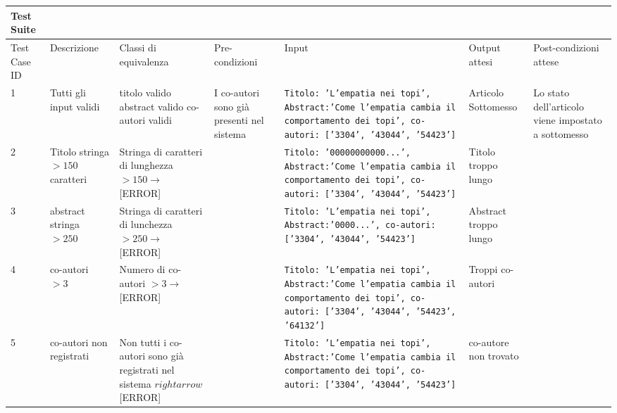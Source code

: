 \begin{sidewaystable}
  \small
  \centering
  \begin{tabular}{|p{2cm}|p{3cm}|p{3cm}|p{3cm}|p{3cm}|p{3cm}|p{3cm}|}
    \hline
    Test Suite &&&&&& \\
    \hline
    \hline
    Test Case ID & Descrizione & Classi di equivalenza & Pre\hyp{}condizioni & Input & Output attesi & Post\hyp{}condizioni attese \\
    \hline
    1 & Tutti gli input validi & titolo valido abstract valido co-autori validi & I co\hyp{}autori sono già presenti nel sistema & \texttt{Titolo: 'L'empatia nei topi', Abstract:'Come l'empatia cambia il comportamento dei topi', co-autori: ['3304', '43044', '54423']}& Articolo Sottomesso & Lo stato dell'articolo viene impostato a sottomesso \\
    \hline
    2 & Titolo stringa \(>150\) caratteri & Stringa di caratteri di lunghezza \(> 150 \rightarrow\) [ERROR]  & & \texttt{Titolo: '00000000000...', Abstract:'Come l'empatia cambia il comportamento dei topi', co-autori: ['3304', '43044', '54423']} & Titolo troppo lungo & \\
    \hline
    3 & abstract stringa \(> 250\) & Stringa di caratteri di lunchezza \(> 250 \rightarrow\) [ERROR] & &  \texttt{Titolo: 'L'empatia nei topi', Abstract:'0000...', co-autori: ['3304', '43044', '54423']} & Abstract troppo lungo & \\
    \hline
    4 & co\hyp{}autori \(> 3\) & Numero di co-autori \(> 3 \rightarrow\) [ERROR] & &\texttt{Titolo: 'L'empatia nei topi', Abstract:'Come l'empatia cambia il comportamento dei topi', co-autori: ['3304', '43044', '54423', '64132']} & Troppi co\hyp{}autori & \\
    \hline
    5 & co\hyp{}autori non registrati & Non tutti i co-autori sono già registrati nel sistema \(rightarrow\) [ERROR]  & &\texttt{Titolo: 'L'empatia nei topi', Abstract:'Come l'empatia cambia il comportamento dei topi', co-autori: ['3304', '43044', '54423']} & co\hyp{}autore non trovato & \\
    \hline
  \end{tabular}
\end{sidewaystable}


